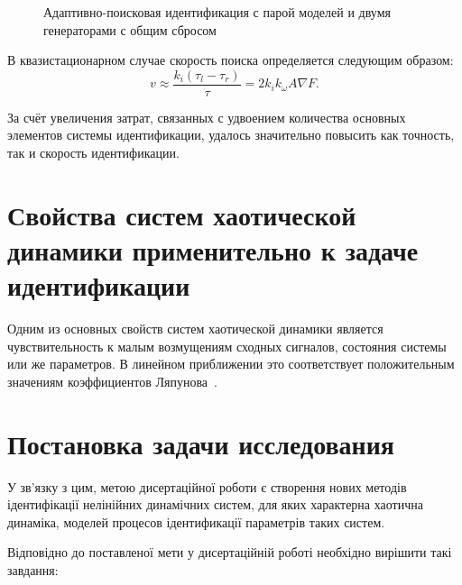 \begin{figure}[htb!]
\begin{center}

\end{center}
\caption{Адаптивно-поисковая идентификация с парой моделей и двумя генераторами с общим сбросом}
\label{atu:f:apid2}
\end{figure}


В квазистационарном случае скорость поиска определяется следующим образом:
%
\begin{equation}
\label{atu:eq:vugpk2}
  v
  \approx
  \frac{k_i (\tau_l - \tau_r)}{\tau}
  =
  2 k_i k_\omega A \nabla F .
\end{equation}

За счёт увеличения затрат, связанных с удвоением количества основных элементов системы идентификации,
удалось значительно повысить как точность, так и скорость идентификации.











\section{Свойства систем хаотической динамики применительно к задаче идентификации}  %

Одним из основных свойств систем хаотической динамики является чувствительность
к малым возмущениям сходных сигналов, состояния системы или же параметров.
В линейном приближении это соответствует положительным значениям
коэффициентов Ляпунова~\cite{magni_theory_dyn_chaos,moon_chaotic_vibr}.



\section{Постановка задачи исследования}  %



У зв’язку з цим, метою дисертаційної роботи є створення
нових методів ідентифікації нелінійних динамічних систем,
для яких характерна хаотична динаміка,
моделей процесов ідентификації параметрів таких систем.

Відповідно до поставленої мети у дисертаційній роботі необхідно
вирішити такі завдання:

